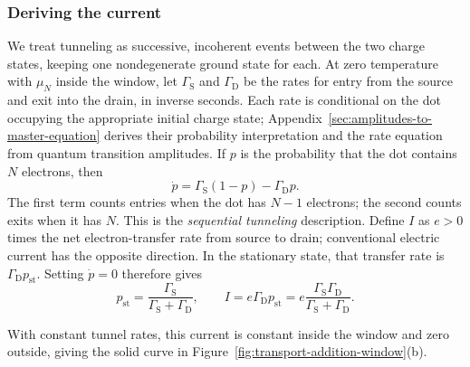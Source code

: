 \subsubsection{Deriving the current}
\label{sec:measurement-current-derivation}

We treat tunneling as successive, incoherent events between the
two charge states, keeping one nondegenerate ground state for each.
At zero temperature with $\mu_N$ inside the window, let
$\Gamma_{\mathrm S}$ and
$\Gamma_{\mathrm D}$ be the rates for entry from the source and
exit into the drain, in inverse seconds. Each rate is conditional
on the dot occupying the appropriate initial charge state;
Appendix~\ref{sec:amplitudes-to-master-equation} derives their
probability interpretation and the rate equation from quantum
transition amplitudes. If $p$ is the probability
that the dot contains $N$ electrons, then
\begin{equation}
 \dot p=\Gamma_{\mathrm S}(1-p)-\Gamma_{\mathrm D}p.
 \label{eq:measurement-zero-temperature-master-equation}
\end{equation}
The first term counts entries when the dot has $N-1$ electrons;
the second counts exits when it has $N$. This is the
\emph{sequential tunneling} description. Define $I$ as $e>0$ times the net electron-transfer
rate from source to drain; conventional electric current has the
opposite direction. In the stationary state, that transfer rate is
$\Gamma_{\mathrm D}p_{\mathrm{st}}$. Setting $\dot p=0$ therefore gives
\begin{equation}
 p_{\mathrm{st}}=\frac{\Gamma_{\mathrm S}}
                          {\Gamma_{\mathrm S}+\Gamma_{\mathrm D}},
 \qquad
 I=e\Gamma_{\mathrm D}p_{\mathrm{st}}
   =e\frac{\Gamma_{\mathrm S}\Gamma_{\mathrm D}}
             {\Gamma_{\mathrm S}+\Gamma_{\mathrm D}}.
 \label{eq:measurement-zero-temperature-current}
\end{equation}

With constant tunnel rates, this current is constant inside the
window and zero outside, giving the solid curve in
Figure~\ref{fig:transport-addition-window}(b).

